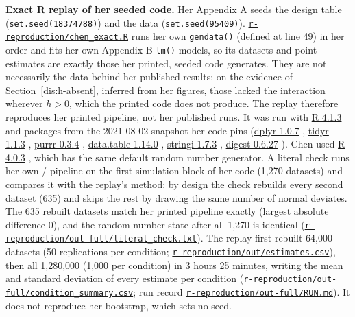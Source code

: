 \textbf{Exact R replay of her seeded code.} Her Appendix A seeds the design table (\texttt{set.seed(18374788)}) and the data (\texttt{set.seed(95409)}). \href{https://github.com/alectionary/vibe-math/blob/master/formalization/chen-rdd-mediation/r-reproduction/chen_exact.R}{\nolinkurl{r-reproduction/chen_exact.R}} runs her own \texttt{gendata()} (defined at line 49) in her order and fits her own Appendix B \texttt{lm()} models, so its datasets and point estimates are exactly those her printed, seeded code generates. They are not necessarily the data behind her published results: on the evidence of Section~\ref{dis:h-absent}, inferred from her figures, those lacked the interaction wherever $h > 0$, which the printed code does not produce. The replay therefore reproduces her printed pipeline, not her published runs. It was run with \href{https://www.r-project.org/}{R 4.1.3} \citep{rcore2022} and packages from the 2021-08-02 snapshot her code pins (\href{https://cran.r-project.org/package=dplyr}{dplyr 1.0.7} \citep{dplyr2021}, \href{https://cran.r-project.org/package=tidyr}{tidyr 1.1.3} \citep{tidyr2021}, \href{https://cran.r-project.org/package=purrr}{purrr 0.3.4} \citep{purrr2020}, \href{https://cran.r-project.org/package=data.table}{data.table 1.14.0} \citep{datatable2021}, \href{https://cran.r-project.org/package=stringi}{stringi 1.7.3} \citep{stringi2021}, \href{https://cran.r-project.org/package=digest}{digest 0.6.27} \citep{digest2020}). Chen used \href{https://www.r-project.org/}{R 4.0.3} \citep{rcore2021}, which has the same default random number generator. A literal check runs her own \texttt{}/\texttt{} pipeline on the first simulation block of her code (1,270 datasets) and compares it with the replay's method: by design the check rebuilds every second dataset (635) and skips the rest by drawing the same number of normal deviates. The 635 rebuilt datasets match her printed pipeline exactly (largest absolute difference 0), and the random-number state after all 1,270 is identical (\href{https://github.com/alectionary/vibe-math/blob/master/formalization/chen-rdd-mediation/r-reproduction/out-full/literal_check.txt}{\nolinkurl{r-reproduction/out-full/literal_check.txt}}). The replay first rebuilt 64,000 datasets (50 replications per condition; \href{https://github.com/alectionary/vibe-math/blob/master/formalization/chen-rdd-mediation/r-reproduction/out/estimates.csv}{\nolinkurl{r-reproduction/out/estimates.csv}}), then all 1,280,000 (1,000 per condition) in 3 hours 25 minutes, writing the mean and standard deviation of every estimate per condition (\href{https://github.com/alectionary/vibe-math/blob/master/formalization/chen-rdd-mediation/r-reproduction/out-full/condition_summary.csv}{\nolinkurl{r-reproduction/out-full/condition_summary.csv}}; run record \href{https://github.com/alectionary/vibe-math/blob/master/formalization/chen-rdd-mediation/r-reproduction/out-full/RUN.md}{\nolinkurl{r-reproduction/out-full/RUN.md}}). It does not reproduce her bootstrap, which sets no seed.

